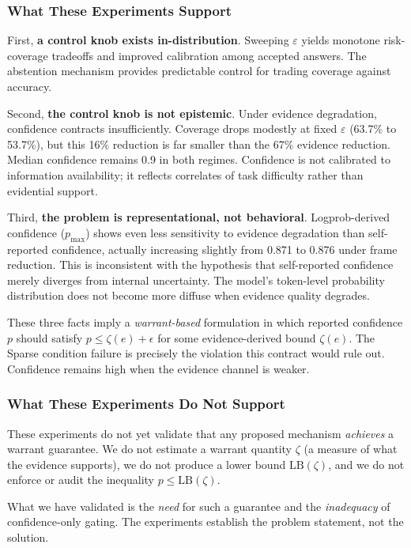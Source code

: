 \documentclass{article}
\begin{document}
\subsubsection{What These Experiments Support}

First, \textbf{a control knob exists in-distribution}. Sweeping $\varepsilon$ yields monotone risk-coverage tradeoffs and improved calibration among accepted answers. The abstention mechanism provides predictable control for trading coverage against accuracy.

Second, \textbf{the control knob is not epistemic}. Under evidence degradation, confidence contracts insufficiently. Coverage drops modestly at fixed $\varepsilon$ (63.7\% to 53.7\%), but this 16\% reduction is far smaller than the 67\% evidence reduction. Median confidence remains 0.9 in both regimes. Confidence is not calibrated to information availability; it reflects correlates of task difficulty rather than evidential support.

Third, \textbf{the problem is representational, not behavioral}. Logprob-derived confidence ($p_{\max}$) shows even less sensitivity to evidence degradation than self-reported confidence, actually increasing slightly from 0.871 to 0.876 under frame reduction. This is inconsistent with the hypothesis that self-reported confidence merely diverges from internal uncertainty. The model's token-level probability distribution does not become more diffuse when evidence quality degrades.

These three facts imply a \emph{warrant-based} formulation in which reported confidence $p$ should satisfy $p \le \zeta(e) + \epsilon$ for some evidence-derived bound $\zeta(e)$. The Sparse condition failure is precisely the violation this contract would rule out. Confidence remains high when the evidence channel is weaker.

\subsubsection{What These Experiments Do Not Support}

These experiments do not yet validate that any proposed mechanism \emph{achieves} a warrant guarantee. We do not estimate a warrant quantity $\zeta$ (a measure of what the evidence supports), we do not produce a lower bound $\text{LB}(\zeta)$, and we do not enforce or audit the inequality $p \leq \text{LB}(\zeta)$.

What we have validated is the \emph{need} for such a guarantee and the \emph{inadequacy} of confidence-only gating. The experiments establish the problem statement, not the solution.
\end{document}
